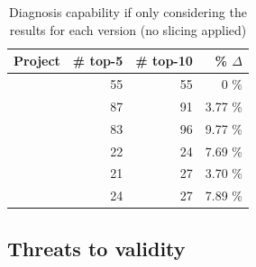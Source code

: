 \documentclass{article}
\begin{document}
\begin{table}[h]
	\centering
	\setlength{\tabcolsep}{4pt}
	  \begin{tabular}{lrrr}
		\toprule
		Project            & \# top-5 & \# top-10 &  \% $\Delta$   \\ %
		\midrule
		\lang{}            & 55 & 55 & 0 \%       \\   %
		\cmath{}           & 87  & 91 & 3.77 \%     \\   %
		\closure{}         & 83  & 96  & 9.77 \%     \\   %
		\chart{}           & 22  & 24 & 7.69 \%      \\  %
		\jtime{}           & 21  & 27 & 3.70 \%       \\   %
		\mockito{}         & 24  & 27 & 7.89 \%    \\     %
		\bottomrule
	\end{tabular}
  \caption {Diagnosis capability if only considering the \sfl{} results for each version (no slicing applied)}
  \label{table:fs}
  \end{table}
  \normalsize


\subsection{Threats to validity}

\end{document}
